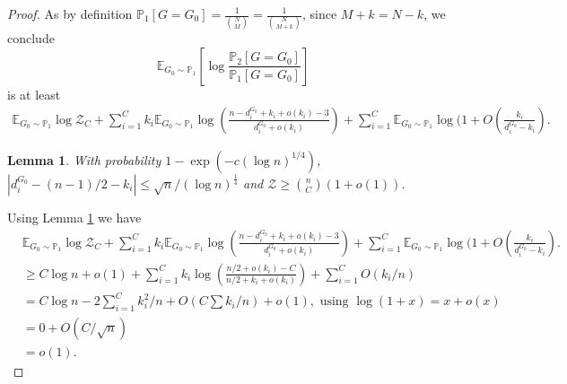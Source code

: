 \documentclass[12pt,a4paper]{article}
\numberwithin{equation}{section}
\newtheorem{lemma}[theorem]{Lemma}
\numberwithin{equation}{section}
\newcommand{\1}{{\text{\Large $\mathfrak 1$}}}
\newcommand{\2}[1]{{\text{\Large $\mathfrak 1$}\!\left(#1\right)}}
\begin{document}
\begin{proof}
As by definition $\mathbb{P}_1[G=G_0]=\frac{1}{\binom{N}{M}}=\frac{1}{\binom{N}{M+k}}$, since $M+k=N-k$, we conclude 
$$\mathbb{E}_{G_0 \sim \mathbb{P}_1} \left[ \log \frac{\mathbb{P}_2[G=G_0]}{\mathbb{P}_1[G=G_0]}  \right]$$is at least
\begin{align*}\mathbb{E}_{G_0 \sim \mathbb{P}_1} \log \mathcal{Z}_C+\sum_{i=1}^Ck_i\mathbb{E}_{G_0 \sim \mathbb{P}_1}\log \left(\frac{n-d^{G_0}_i+k_i+o(k_i)-3}{d^{G_0}_i+o(k_i)}\right)+\sum_{i=1}^C\mathbb{E}_{G_0 \sim \mathbb{P}_1}\log (1+O(\frac{k_i}{d^{G_0}_i-k_i}).\end{align*} 


\begin{lemma}\label{lem1}
With probability $1-\exp(-c(\log n)^{1/4})$, $|d^{G_0}_i-(n-1)/2-k_i| \leq \sqrt{n}/(\log n)^{\frac{1}{4}}$ and $ \mathcal{Z} \geq \binom{n}{C}(1+o(1))$.
\end{lemma}

Using Lemma \ref{lem1} we have
\begin{align*}
&\mathbb{E}_{G_0 \sim \mathbb{P}_1} \log \mathcal{Z}_C+\sum_{i=1}^Ck_i\mathbb{E}_{G_0 \sim \mathbb{P}_1}\log \left(\frac{n-d^{G_0}_i+k_i+o(k_i)-3}{d^{G_0}_i+o(k_i)}\right)+\sum_{i=1}^C\mathbb{E}_{G_0 \sim \mathbb{P}_1}\log (1+O(\frac{k_i}{d^{G_0}_i-k_i}).\\
& \geq C\log n+o(1)+\sum_{i=1}^Ck_i\log \left(\frac{n/2+o(k_i)-C}{n/2+k_i+o(k_i)}\right)+\sum_{i=1}^CO(k_i/n)\\
&= C\log n-2\sum_{i=1}^Ck_i^2/n+O(C\sum k_i /n)+o(1), \text{ using } \log (1+x)=x+o(x)\\
&=0+O(C/\sqrt{n})\\
&=o(1).
\end{align*}


\end{proof}
\end{document}

